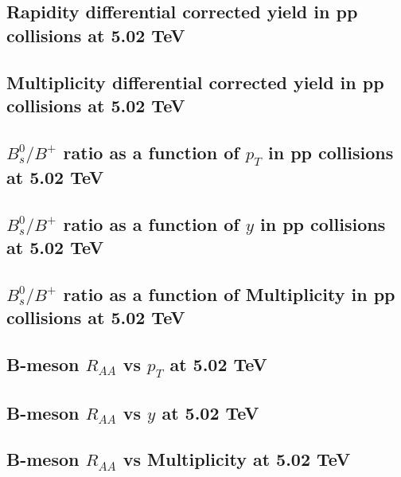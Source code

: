 \subsection{Rapidity differential corrected yield in pp collisions at 5.02 TeV}

\subsection{Multiplicity differential corrected yield in pp collisions at 5.02 TeV}


\subsection{$B^{0}_{s}/B^{+}$ ratio as a function of $p_T$ in pp collisions at 5.02 TeV}


\subsection{$B^{0}_{s}/B^{+}$ ratio as a function of $y$ in pp collisions at 5.02 TeV}

\subsection{$B^{0}_{s}/B^{+}$ ratio as a function of Multiplicity in pp collisions at 5.02 TeV}


\subsection{B-meson $R_{AA}$ vs $p_T$ at 5.02 TeV}
\subsection{B-meson $R_{AA}$ vs $y$ at 5.02 TeV}
\subsection{B-meson $R_{AA}$ vs Multiplicity at 5.02 TeV}



\clearpage
